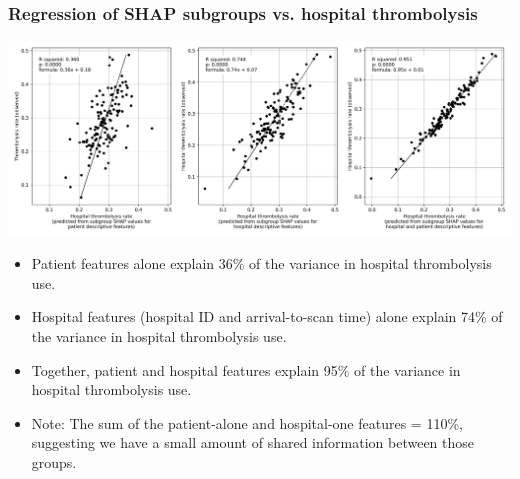 \begin{frame}
\frametitle{Regression of SHAP subgroups vs. hospital thrombolysis}

\begin{center}
\includegraphics[width=1.0\textwidth]{./images/03e_xgb_10_features_multiple_regression_patient_hosptia_mean.jpg}
\end{center}

\scriptsize
\begin{itemize}
    \item Patient features alone explain 36\% of the variance in hospital thrombolysis use.
    \item Hospital features (hospital ID and arrival-to-scan time) alone explain 74\% of the variance in hospital thrombolysis use.
    \item Together, patient and hospital features explain 95\% of the variance in hospital thrombolysis use.
    \item Note: The sum of the patient-alone and hospital-one features = 110\%, suggesting we have a small amount of shared information between those groups.
\end{itemize}
 
\end{frame}